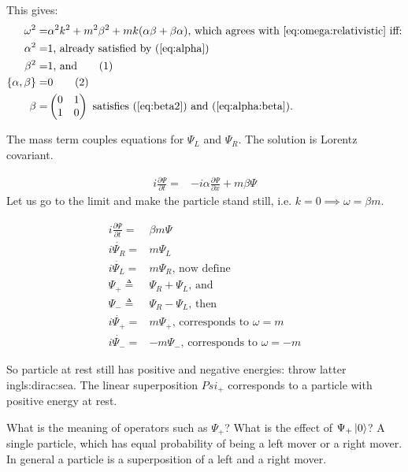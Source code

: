 \documentclass[]{article}
\newcommand\numberthis{\addtocounter{equation}{1}\tag{\theequation}}
\begin{document}
This gives:
\begin{align*}
	\omega^2 =& \alpha^2 k^2 + m^2 \beta^2 + m k (\alpha \beta + \beta \alpha) \text{, which agrees with \eqref{eq:omega:relativistic} iff:}\\
	\alpha^2 =& 1 \text{, already satisfied by (\ref{eq:alpha})}\\
	\beta^2 =& 1 \text{, and}\numberthis \label{eq:beta2}\\ 
	\{\alpha,\beta\} =& 0 \numberthis \label{eq:alpha:beta}\\
	\beta =& \begin{pmatrix}
	0 & 1\\
	1 & 0
	\end{pmatrix} \text{ satisfies (\ref{eq:beta2}) and (\ref{eq:alpha:beta}).}
\end{align*}

The mass term couples equations for $\Psi_L$ and $\Psi_R$. The solution is Lorentz covariant.

\begin{align*}
	i \frac{\partial \Psi}{\partial t} =& -i \alpha \frac{\partial \Psi}{\partial x} + m \beta \Psi
\end{align*}
Let us go to the limit and make the particle stand still, i.e. $k=0 \implies \omega = \beta m$.

\begin{align*}
	i \frac{\partial \Psi}{\partial t} =& \beta m \Psi\\
	i \dot{\Psi_R} =& m \Psi_L\\
	i \dot{\Psi_L} =&  m \Psi_R \text{, now define}\\
	\Psi_+\triangleq&\Psi_R + \Psi_L \text{, and}\\
	\Psi_-\triangleq&\Psi_R - \Psi_L \text{, then} \\
	i \dot{\Psi_+} =&  m \Psi_+ \text{, corresponds to $\omega=m$}\\
	i \dot{\Psi_-} =&  -m \Psi_- \text{, corresponds to $\omega=-m$}
\end{align*}

So particle at rest still has positive and negative energies: throw latter in\gls{gls:dirac:sea}. The linear superposition $Psi_+$ corresponds to a particle with positive energy at rest.

What is the meaning of operators such as $\Psi_+$? What is the effect of $\Psi_+\ket{0}$? A single particle, which has equal probability of being a left mover or a right mover. In general a particle is a superposition of a left and a right mover.
\end{document}
